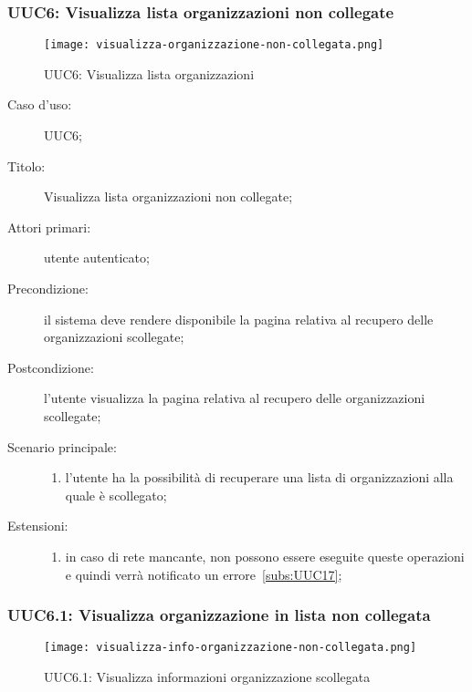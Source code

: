 \documentclass[../../../analisi-dei-requisiti.tex]{subfiles}
\begin{document}
\subsubsection{UUC6: Visualizza lista organizzazioni non collegate}%
\label{subs:UUC6}

\begin{figure}[H]
  \centering
  \texttt{[image: visualizza-organizzazione-non-collegata.png]}
  \caption{UUC6: Visualizza lista organizzazioni}%
  \label{fig:UUC6}
\end{figure}

\begin{description}
  \item[Caso d’uso:] UUC6;
  \item[Titolo:] Visualizza lista organizzazioni non collegate;
  \item[Attori primari:] utente autenticato;
  \item[Precondizione:] il sistema deve rendere disponibile la pagina relativa al recupero delle organizzazioni scollegate;
  \item[Postcondizione:] l'utente visualizza la pagina relativa al recupero delle organizzazioni scollegate;
  \item[Scenario principale:]
        \begin{enumerate}
          \item l'utente ha la possibilità di recuperare una lista di organizzazioni alla quale è scollegato;
        \end{enumerate}
  \item[Estensioni:]
        \begin{enumerate}
          \item in caso di rete mancante, non possono essere eseguite queste operazioni e quindi verrà notificato un errore~\ref{subs:UUC17};
        \end{enumerate}
\end{description}

\subsubsection{UUC6.1: Visualizza organizzazione in lista non collegata}%
\label{subs:UUC6.1}

\begin{figure}[H]
  \centering
  \texttt{[image: visualizza-info-organizzazione-non-collegata.png]}
  \caption{UUC6.1: Visualizza informazioni organizzazione scollegata}%
  \label{fig:UUC6.1}
\end{figure}
\end{document}
